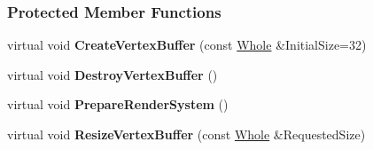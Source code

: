 \subsubsection*{Protected Member Functions}
\begin{DoxyCompactItemize}
\item 
\hypertarget{classMezzanine_1_1UI_1_1Screen_aebf418ad2af79578d85d8d1518a5ed5b}{
virtual void {\bfseries CreateVertexBuffer} (const \hyperlink{namespaceMezzanine_adcbb6ce6d1eb4379d109e51171e2e493}{Whole} \&InitialSize=32)}
\label{classMezzanine_1_1UI_1_1Screen_aebf418ad2af79578d85d8d1518a5ed5b}

\item 
\hypertarget{classMezzanine_1_1UI_1_1Screen_ac0d9c1fef73d633da2b39bf7e377138b}{
virtual void {\bfseries DestroyVertexBuffer} ()}
\label{classMezzanine_1_1UI_1_1Screen_ac0d9c1fef73d633da2b39bf7e377138b}

\item 
\hypertarget{classMezzanine_1_1UI_1_1Screen_a2db3c8fb07a8a6c58c42cd03b3352bab}{
virtual void {\bfseries PrepareRenderSystem} ()}
\label{classMezzanine_1_1UI_1_1Screen_a2db3c8fb07a8a6c58c42cd03b3352bab}

\item 
\hypertarget{classMezzanine_1_1UI_1_1Screen_af42ac72231ad9c67238d578302503261}{
virtual void {\bfseries ResizeVertexBuffer} (const \hyperlink{namespaceMezzanine_adcbb6ce6d1eb4379d109e51171e2e493}{Whole} \&RequestedSize)}
\label{classMezzanine_1_1UI_1_1Screen_af42ac72231ad9c67238d578302503261}

\end{DoxyCompactItemize}
